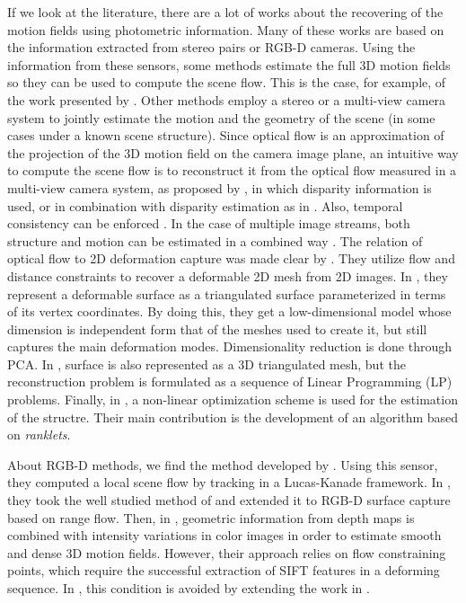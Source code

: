 If we look at the literature, there are a lot of works about the recovering of the motion fields using photometric information. Many of these works are based on the information extracted from stereo  pairs or RGB-D cameras. Using the information from these sensors, some methods estimate the full 3D motion fields so they can be used to compute the scene flow. This is the case, for example, of the work presented by \cite{mateus2012towards}. Other methods employ a stereo or a multi-view camera system to jointly estimate the motion and the geometry of the scene (in some cases under a known scene structure). Since optical flow is an approximation of the projection of the 3D motion field on the camera image plane, an intuitive way to compute the scene flow is to reconstruct it from the optical flow measured in a multi-view camera system, as proposed by \cite{vedula1999three}, in which disparity information is used, or in combination with disparity estimation as in \cite{huguet2007variational, li2008multi, zhang20013d}. Also, temporal consistency can be enforced \citep{rabe2010dense}. In the case of multiple image streams, both structure and motion can be estimated in a combined way \citep{pons2007multi, basha2013multi}. The relation of optical flow to 2D deformation capture was made clear by \cite{hilsmann2007deformable}. They utilize flow and distance constraints to recover a deformable 2D mesh from 2D images. In \cite{salzmann2007surface}, they represent a deformable surface as a triangulated surface parameterized in terms of its vertex coordinates. By doing this, they get a low-dimensional model whose dimension is independent form that of the meshes used to create it, but still captures the main deformation modes. Dimensionality reduction is done through \ac{PCA}. In \cite{wang2010monocular}, surface is also represented as a 3D triangulated mesh, but the reconstruction problem is formulated as a sequence of Linear Programming (LP) problems. Finally, in \cite{delbue2007nonrigid}, a non-linear optimization scheme is used for the estimation of the structre. Their main contribution is the development of an algorithm based on \emph{ranklets}.

About RGB-D methods, we find the method developed by \cite{quiroga2014local}. Using this sensor, they computed a local scene flow by tracking in a Lucas-Kanade framework. In \cite{spies2000dense}, they took the well studied method of \cite{horn1981determining} and extended it to RGB-D surface capture based on range flow. Then, in \cite{petit2011surface, letouzey2011scene}, geometric information from depth maps is combined with intensity variations in color images in order to estimate smooth and dense 3D motion fields. However, their approach relies on flow constraining points, which require the successful extraction of SIFT features in a deforming sequence. In \cite{wang2010monocular}, this condition is avoided by extending the work in \cite{spies2000dense}. 

